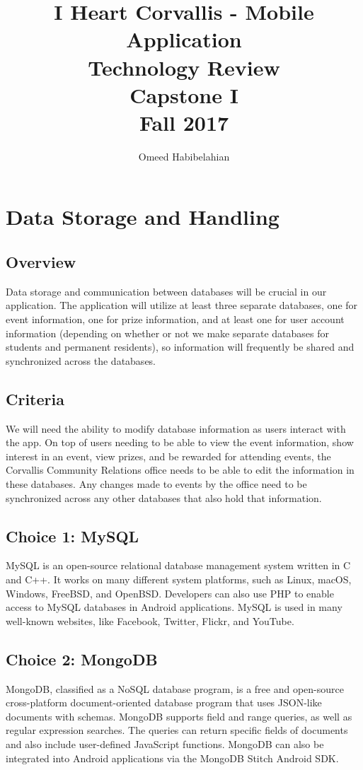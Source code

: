 \documentclass[draftclsnofoot, onecolumn, 10pt, compsoc]{IEEEtran}
\title{\textbf{I Heart Corvallis - Mobile Application\\Technology Review}\\Capstone I\\Fall 2017}
\author{Omeed Habibelahian}
\begin{document}
	\maketitle
	\begin{abstract}
	\end{abstract}
	\newpage
	
	\section{Data Storage and Handling}
		\subsection{Overview}
			Data storage and communication between databases will be crucial in our application. The application will utilize at least three separate databases, one for event information, one for prize information, and at least one for user account information (depending on whether or not we make separate databases for students and permanent residents), so information will frequently be shared and synchronized across the databases.
		\subsection{Criteria}
			We will need the ability to modify database information as users interact with the app. On top of users needing to be able to view the event information, show interest in an event, view prizes, and be rewarded for attending events, the Corvallis Community Relations office needs to be able to edit the information in these databases. Any changes made to events by the office need to be synchronized across any other databases that also hold that information.
		\subsection{Choice 1: MySQL}
			MySQL is an open-source relational database management system written in C and C++. It works on many different system platforms, such as Linux, macOS, Windows, FreeBSD, and OpenBSD. Developers can also use PHP to enable access to MySQL databases in Android applications. MySQL is used in many well-known websites, like Facebook, Twitter, Flickr, and YouTube.
			~\cite{wiki:MySQL}
			~\cite{MySQL_Android}
			
		\subsection{Choice 2: MongoDB}
			MongoDB, classified as a NoSQL database program, is a free and open-source cross-platform document-oriented database program that uses JSON-like documents with schemas. MongoDB supports field and range queries, as well as regular expression searches. The queries can return specific fields of documents and also include user-defined JavaScript functions. MongoDB can also be integrated into Android applications via the MongoDB Stitch Android SDK.
			~\cite{wiki:MongoDB}
			~\cite{MongoDB_Android}
			
\end{document}
